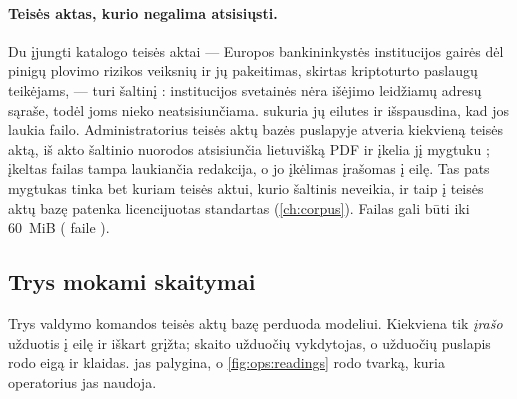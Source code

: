 \paragraph{Teisės aktas, kurio negalima atsisiųsti.} Du įjungti katalogo teisės aktai --- Europos
bankininkystės institucijos gairės dėl pinigų plovimo rizikos veiksnių ir jų pakeitimas, skirtas
kriptoturto paslaugų teikėjams, --- turi šaltinį : institucijos svetainės nėra
išėjimo leidžiamų adresų sąraše, todėl joms nieko neatsisiunčiama.  sukuria jų
eilutes ir išspausdina, kad jos laukia failo. Administratorius teisės aktų bazės puslapyje atveria
kiekvieną teisės aktą, iš akto šaltinio nuorodos atsisiunčia lietuvišką PDF ir įkelia jį mygtuku
; įkeltas failas tampa laukiančia redakcija, o jo įkėlimas įrašomas į
eilę. Tas pats mygtukas tinka bet kuriam teisės aktui, kurio šaltinis neveikia, ir taip į teisės
aktų bazę patenka licencijuotas standartas (\cref{ch:corpus}). Failas gali būti iki 60~MiB
( faile ).

\subsection{Trys mokami skaitymai}\label{sec:ops:readings}

Trys valdymo komandos teisės aktų bazę perduoda modeliui. Kiekviena tik \emph{įrašo} užduotis į
eilę ir iškart grįžta; skaito užduočių vykdytojas, o užduočių puslapis rodo eigą ir klaidas.
 jas palygina, o \cref{fig:ops:readings} rodo tvarką, kuria operatorius
jas naudoja.

